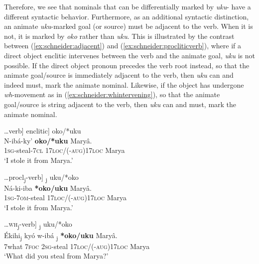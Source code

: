\documentclass[output=paper]{langscibook}
\begin{document}
\z
 
Therefore, we see that nominals that can be differentially marked by \textit{uku}- have a different syntactic behavior. Furthermore, as an additional syntactic distinction, an animate \textit{uku}-marked goal (or source) must be adjacent to the verb. When it is not, it is marked by \textit{oko} rather than \textit{uku}. This is illustrated by the contrast between (\ref{ex:schneider:adjacent}) and (\ref{ex:schneider:procliticverb}), where if a direct object enclitic intervenes between the verb and the animate goal, \textit{uku} is not possible. If the direct object pronoun precedes the verb root instead, so that the animate goal/source is immediately adjacent to the verb, then \textit{uku} can and indeed must, mark the animate nominal. Likewise, if the object has undergone \textit{wh}-movement as in (\ref{ex:schneider:whintervening}), so that the animate goal/source is string adjacent to the verb, then \textit{uku} can and must, mark the animate nominal. 


\ea \label{ex:schneider:examplesadjacency}
\begin{xlist}

\ex \label{ex:schneider:adjacent}
\ldots verb] enclitic] oko/*uku \\
\gll N-ibá-ky' \textbf{oko/*uku} Mary\^a. \\
\textsc{1sg}-steal-\textsc{7cl} \textsc{17loc/(-aug)17loc} Marya \\
\glt `I stole it from Marya.'

\ex \label{ex:schneider:procliticverb}
\ldots procl\textsubscript{j}-verb] \underline{\hspace{0.55cm}}\textsubscript{j} uku/*oko \\
\gll Ná-ki-iba \textbf{*oko/\Checkmark uku} Mary\^a. \\
\textsc{1sg}-\textsc{7om}-steal \textsc{17loc/(-aug)17loc} Marya \\
\glt `I stole it from Marya.'

 
\ex \label{ex:schneider:whintervening}
\ldots\textsc{wh}\textsubscript{j}-verb] \underline{\hspace{0.55cm}}\textsubscript{j} uku/*oko \\
\gll \'Ekihi\textsubscript{j} ky\'o w-ibá \underline{\hspace{0.5cm}}\textsubscript{j} \textbf{*oko/\Checkmark uku} Mary\^a. \\
7what \textsc{7foc} \textsc{2sg-}steal {  } \textsc{17loc/(-aug)17loc} Marya \\
\glt `What did you steal from Marya?'


\end{xlist}
\end{document}
